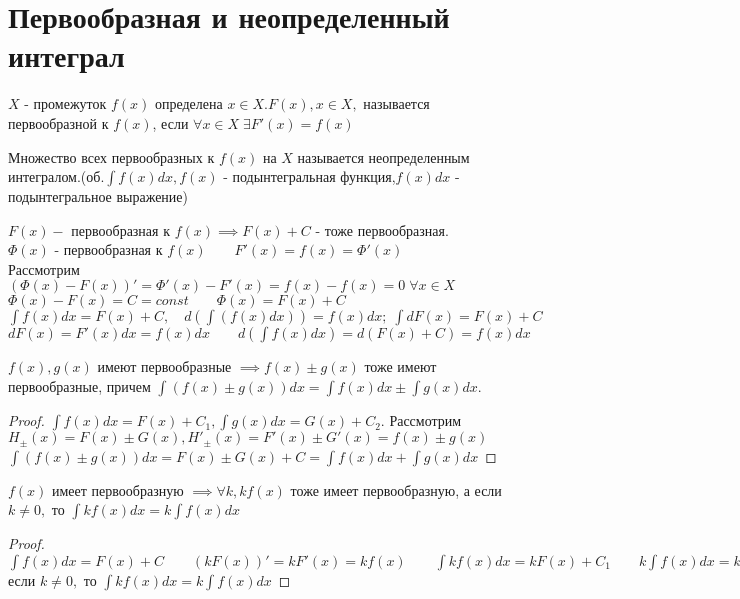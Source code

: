 \documentclass[../main.tex]{subfiles}
\begin{document}
\section{Первообразная и неопределенный интеграл}

\begin{definition}
     $X$ - промежуток $f(x)$ определена $x\in X. F(x), x\in X,$ называется первообразной к $f(x)$, если $\forall x \in X\; \exists F'(x)=f(x)$
\end{definition}
\begin{definition}
    Множество всех первообразных к $f(x)$ на $X$ называется неопределенным интегралом.(об.$\displaystyle\int{f(x)dx}, f(x)$ - подынтегральная функция,$f(x)dx$ - подынтегральное выражение)\\
\end{definition}

$F(x) - $ первообразная к $f(x)\implies F(x)+C$ - тоже первообразная.\\
$\varPhi(x)$ - первообразная к $f(x)\qquad F'(x)=f(x)=\varPhi'(x)$\\
Рассмотрим $(\varPhi(x)-F(x))'=\varPhi'(x)-F'(x)=f(x)-f(x)=0\;\forall x \in X$\\ 
$\varPhi(x)-F(x)=C=const\qquad \varPhi(x)=F(x)+C$\\
$\displaystyle\int f(x)dx=F(x)+C,\quad d(\int (f(x)dx))=f(x)dx;\;\int dF(x)=F(x)+C$\\
$dF(x)=F'(x)dx=f(x)dx\qquad d(\displaystyle\int f(x)dx)=d(F(x)+C)=f(x)dx$

\begin{theorem}
    $f(x),g(x)$ имеют первообразные $\implies f(x)\pm g(x)$ тоже имеют первообразные, причем $\displaystyle\int(f(x)\pm g(x))dx=\int f(x)dx \pm \int g(x)dx.$
\end{theorem}
\begin{proof}
    $\displaystyle\int f(x)dx=F(x)+C_{1},\int g(x)dx=G(x)+C_{2}.$ Рассмотрим $H_{\pm}(x)=F(x)\pm G(x), H'_{\pm}(x)=F'(x)\pm G'(x)=f(x)\pm g(x)$\\ 
$\displaystyle\int(f(x)\pm g(x))dx=F(x)\pm G(x)+C=\int f(x)dx+\int g(x)dx$ 
\end{proof}
\begin{theorem}
    $f(x)$ имеет первообразную $\implies \forall k, kf(x)$ тоже имеет первообразную, а если $k \neq 0,$ то $\int kf(x)dx=k\int f(x)dx$
\end{theorem}
\begin{proof}
$\displaystyle\int f(x)dx=F(x)+C\qquad (kF(x))'=kF'(x)=kf(x)\qquad\int kf(x)dx=kF(x)+C_{1}\qquad k\int f(x)dx=k(F(x)+C)=kF(x)+kC,\quad \int kf(x)dx=kF(x)=C_{1},\quad k\int f(x)dx=k(F(x)+C)=kF(x)+kC,$ если $k\neq 0,$
то $\displaystyle\int kf(x)dx=k\int f(x)dx$
\end{proof}
\end{document}
